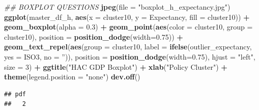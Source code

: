 \documentclass[]{article}
\newenvironment{Shaded}{\begin{snugshade}}{\end{snugshade}}
\newcommand{\CommentTok}[1]{\textcolor[rgb]{0.56,0.35,0.01}{\textit{#1}}}
\newcommand{\DataTypeTok}[1]{\textcolor[rgb]{0.13,0.29,0.53}{#1}}
\newcommand{\DecValTok}[1]{\textcolor[rgb]{0.00,0.00,0.81}{#1}}
\newcommand{\FloatTok}[1]{\textcolor[rgb]{0.00,0.00,0.81}{#1}}
\newcommand{\KeywordTok}[1]{\textcolor[rgb]{0.13,0.29,0.53}{\textbf{#1}}}
\newcommand{\NormalTok}[1]{#1}
\newcommand{\OperatorTok}[1]{\textcolor[rgb]{0.81,0.36,0.00}{\textbf{#1}}}
\newcommand{\StringTok}[1]{\textcolor[rgb]{0.31,0.60,0.02}{#1}}
\begin{document}
\begin{Shaded}
\begin{Highlighting}[]
\CommentTok{## BOXPLOT QUESTIONS}
\KeywordTok{jpeg}\NormalTok{(}\DataTypeTok{file =} \StringTok{"boxplot_h_expectancy.jpg"}\NormalTok{)}
\KeywordTok{ggplot}\NormalTok{(master_df_h, }
       \KeywordTok{aes}\NormalTok{(}\DataTypeTok{x =}\NormalTok{ cluster10, }\DataTypeTok{y =}\NormalTok{ Expectancy, }\DataTypeTok{fill =}\NormalTok{ cluster10)) }\OperatorTok{+}
\StringTok{  }\KeywordTok{geom_boxplot}\NormalTok{(}\DataTypeTok{alpha =} \FloatTok{0.3}\NormalTok{) }\OperatorTok{+}
\StringTok{  }\KeywordTok{geom_point}\NormalTok{(}\KeywordTok{aes}\NormalTok{(}\DataTypeTok{color =}\NormalTok{ cluster10, }\DataTypeTok{group =}\NormalTok{ cluster10), }\DataTypeTok{position =} \KeywordTok{position_dodge}\NormalTok{(}\DataTypeTok{width=}\FloatTok{0.75}\NormalTok{)) }\OperatorTok{+}
\StringTok{  }\KeywordTok{geom_text_repel}\NormalTok{(}\KeywordTok{aes}\NormalTok{(}\DataTypeTok{group =}\NormalTok{ cluster10, }
                \DataTypeTok{label =} \KeywordTok{ifelse}\NormalTok{(outlier_expectancy, }
                  \DataTypeTok{yes =}\NormalTok{ ISO3,}
                  \DataTypeTok{no =} \StringTok{''}\NormalTok{)), }
            \DataTypeTok{position =} \KeywordTok{position_dodge}\NormalTok{(}\DataTypeTok{width=}\FloatTok{0.75}\NormalTok{),}
            \DataTypeTok{hjust =} \StringTok{"left"}\NormalTok{, }\DataTypeTok{size =} \DecValTok{3}\NormalTok{) }\OperatorTok{+}\StringTok{ }\KeywordTok{ggtitle}\NormalTok{(}\StringTok{"HAC GDP Boxplot"}\NormalTok{) }\OperatorTok{+}\StringTok{ }\KeywordTok{xlab}\NormalTok{(}\StringTok{"Policy Cluster"}\NormalTok{) }\OperatorTok{+}\StringTok{ }
\StringTok{  }\KeywordTok{theme}\NormalTok{(}\DataTypeTok{legend.position =} \StringTok{"none"}\NormalTok{)}
\KeywordTok{dev.off}\NormalTok{()}
\end{Highlighting}
\end{Shaded}

\begin{verbatim}
## pdf 
##   2
\end{verbatim}
\end{document}
